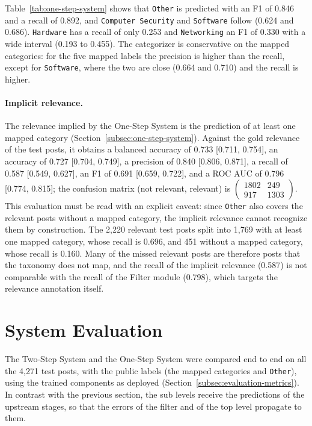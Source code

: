 Table~\ref{tab:one-step-system} shows that \texttt{Other} is predicted with an F1 of 0.846 and a recall of 0.892, and \texttt{Computer Security} and \texttt{Software} follow (0.624 and 0.686). \texttt{Hardware} has a recall of only 0.253 and \texttt{Networking} an F1 of 0.330 with a wide interval (0.193 to 0.455). The categorizer is conservative on the mapped categories: for the five mapped labels the precision is higher than the recall, except for \texttt{Software}, where the two are close (0.664 and 0.710) and the recall is higher.

\paragraph{Implicit relevance.} The relevance implied by the One-Step System is the prediction of at least one mapped category (Section~\ref{subsec:one-step-system}). Against the gold relevance of the test posts, it obtains a balanced accuracy of 0.733 [0.711, 0.754], an accuracy of 0.727 [0.704, 0.749], a precision of 0.840 [0.806, 0.871], a recall of 0.587 [0.549, 0.627], an F1 of 0.691 [0.659, 0.722], and a ROC AUC of 0.796 [0.774, 0.815]; the confusion matrix (not relevant, relevant) is $\begin{pmatrix}1802 & 249\\ 917 & 1303\end{pmatrix}$. This evaluation must be read with an explicit caveat: since \texttt{Other} also covers the relevant posts without a mapped category, the implicit relevance cannot recognize them by construction. The 2,220 relevant test posts split into 1,769 with at least one mapped category, whose recall is 0.696, and 451 without a mapped category, whose recall is 0.160. Many of the missed relevant posts are therefore posts that the taxonomy does not map, and the recall of the implicit relevance (0.587) is not comparable with the recall of the Filter module (0.798), which targets the relevance annotation itself.


\section{System Evaluation}\label{sec:system-evaluation}
The Two-Step System and the One-Step System were compared end to end on all the 4,271 test posts, with the public labels (the mapped categories and \texttt{Other}), using the trained components as deployed (Section~\ref{subsec:evaluation-metrics}). In contrast with the previous section, the sub levels receive the predictions of the upstream stages, so that the errors of the filter and of the top level propagate to them.

